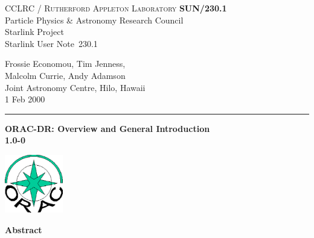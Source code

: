 \documentclass[twoside,11pt]{article}
\newcommand{\stardoccategory}  {Starlink User Note}
\newcommand{\stardocinitials}  {SUN}
\newcommand{\stardocnumber}    {230.1}
\newcommand{\stardocauthors}   {Frossie Economou, Tim Jenness,\\ Malcolm Currie, Andy Adamson\\
Joint Astronomy Centre, Hilo, Hawaii}
\newcommand{\stardocdate}      {1 Feb 2000}
\newcommand{\stardoctitle}     {ORAC-DR: Overview and General Introduction}
\newcommand{\stardocversion}   {1.0-0}
\newcommand{\stardocmanual}    {}
\newcommand{\stardocname}{\stardocinitials /\stardocnumber}
\newenvironment{latexonly}{}{}
\renewcommand{\_}{\texttt{\symbol{95}}}
\begin{document}
\thispagestyle{empty}

\begin{latexonly}
   CCLRC / \textsc{Rutherford Appleton Laboratory} \hfill \textbf{\stardocname}\\
   {\large Particle Physics \& Astronomy Research Council}\\
   {\large Starlink Project\\}
   {\large \stardoccategory\ \stardocnumber}
   \begin{flushright}
   \stardocauthors\\
   \stardocdate
   \end{flushright}
   \vspace{-4mm}
   \rule{\textwidth}{0.5mm}
   \vspace{5mm}
   \begin{center}
   {\Huge\textbf{\stardoctitle \\ [2.5ex]}}
   {\LARGE\textbf{\stardocversion \\ [4ex]}}
   {\Huge\textbf{\stardocmanual}}
   \end{center}
   \vspace{5mm}

\begin{center}
\includegraphics[width=1.0in]{sun230_logo.eps}
\end{center}

   \vspace{10mm}
   \begin{center}
      {\Large\textbf{Abstract}}
   \end{center}
\end{latexonly}
\end{document}
